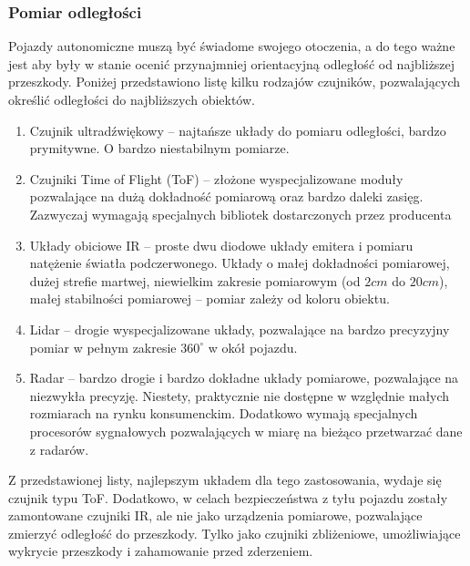         \subsubsection{Pomiar odległości}
            Pojazdy autonomiczne muszą być świadome swojego otoczenia, a do tego ważne jest aby były w stanie ocenić przynajmniej orientacyjną odległość od najbliższej przeszkody.
            Poniżej przedstawiono listę kilku rodzajów czujników, pozwalających określić odległości do najbliższych obiektów.
            \begin{enumerate}
                \item Czujnik ultradźwiękowy -- najtańsze układy do pomiaru odległości, bardzo prymitywne. O bardzo niestabilnym pomiarze.
                \item Czujniki Time of Flight (ToF) -- złożone wyspecjalizowane moduły pozwalające na dużą dokładność pomiarową oraz bardzo daleki zasięg.
                Zazwyczaj wymagają specjalnych bibliotek dostarczonych przez producenta
                \item Układy obiciowe IR -- proste dwu diodowe układy emitera i pomiaru natężenie światła podczerwonego. Układy o małej dokładności pomiarowej, dużej strefie martwej, niewielkim zakresie pomiarowym (od $2cm$ do $20cm$), małej stabilności pomiarowej -- pomiar zależy od koloru obiektu.
                \item Lidar -- drogie wyspecjalizowane układy, pozwalające na bardzo precyzyjny pomiar w pełnym zakresie $360^\circ$ w okół pojazdu.
                \item Radar -- bardzo drogie i bardzo dokładne układy pomiarowe, pozwalające na niezwykła precyzję. Niestety, praktycznie nie dostępne w względnie małych rozmiarach na rynku konsumenckim. Dodatkowo wymają specjalnych procesorów sygnałowych pozwalających w miarę na bieżąco przetwarzać dane z radarów.
            \end{enumerate}
            Z przedstawionej listy, najlepszym układem dla tego zastosowania, wydaje się czujnik typu ToF.
            Dodatkowo, w celach bezpieczeństwa z tyłu pojazdu zostały zamontowane czujniki IR, ale nie jako urządzenia pomiarowe, pozwalające zmierzyć odległość do przeszkody.
            Tylko jako czujniki zbliżeniowe, umożliwiające wykrycie przeszkody i zahamowanie przed zderzeniem.


